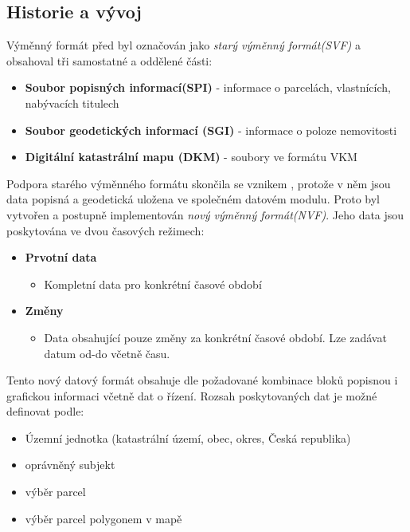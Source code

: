 \subsection{Historie a vývoj}
Výměnný formát před  byl označován jako \textit{starý výměnný formát(SVF)} a obsahoval tři samostatné a oddělené části:
\begin{itemize}
	\item \textbf{Soubor popisných informací(SPI)} - informace o parcelách, vlastnících, nabývacích titulech
	\item \textbf{Soubor geodetických informací (SGI)} - informace o poloze nemovitosti
	\item \textbf{Digitální katastrální mapu (DKM)} - soubory ve formátu VKM
\end{itemize}
Podpora starého výměnného formátu skončila se vznikem , protože v něm jsou data popisná a geodetická uložena ve společném datovém modulu. Proto byl vytvořen a postupně implementován \textit{nový výměnný formát(NVF)}. Jeho data jsou poskytována ve dvou časových režimech:
\begin{itemize}
\item \textbf{Prvotní data}\begin{itemize}
								\item Kompletní data pro konkrétní časové období
						   \end{itemize}

\item \textbf{Změny} \begin{itemize}
								\item Data obsahující pouze změny za konkrétní časové období. Lze zadávat datum od-do včetně času.
							\end{itemize}
\end{itemize}
Tento nový datový formát obsahuje dle požadované kombinace bloků popisnou i grafickou informaci včetně dat o řízení. Rozsah poskytovaných dat je možné definovat podle:
\begin{itemize}
		\item Územní jednotka (katastrální území, obec, okres, Česká republika)
		\item oprávněný subjekt
		\item výběr parcel
		\item výběr parcel polygonem v mapě
\end{itemize}
